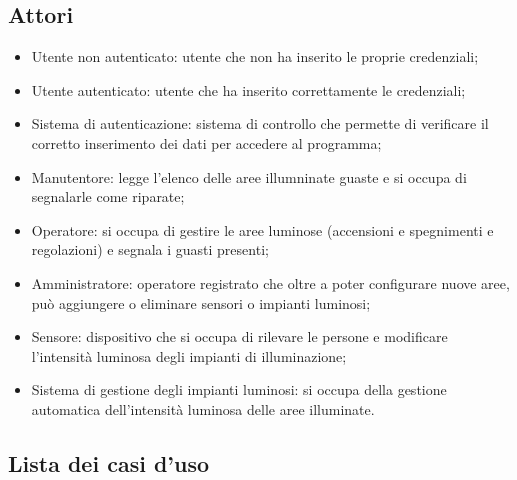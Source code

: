 \documentclass[a4paper, 12pt]{article}
\begin{document}
\subsection{Attori}
\begin{itemize}
    \item Utente non autenticato: utente che non ha inserito le proprie credenziali;
    \item Utente autenticato: utente che ha inserito correttamente le credenziali;
    \item Sistema di autenticazione: sistema di controllo che permette di verificare il corretto inserimento dei dati per accedere al programma;
    \item Manutentore: legge l'elenco delle aree illumninate guaste e si occupa di segnalarle come riparate;
    \item Operatore: si occupa di gestire le aree luminose (accensioni e spegnimenti e regolazioni) e segnala i guasti presenti;
    \item Amministratore: operatore registrato che oltre a poter configurare nuove aree, può aggiungere o eliminare sensori o impianti luminosi;
    \item Sensore: dispositivo che si occupa di rilevare le persone e modificare l'intensità luminosa degli impianti di illuminazione;
    \item Sistema di gestione degli impianti luminosi: si occupa della gestione automatica dell'intensità luminosa delle aree illuminate.
\end{itemize}

\subsection{Lista dei casi d'uso}
\end{document}
